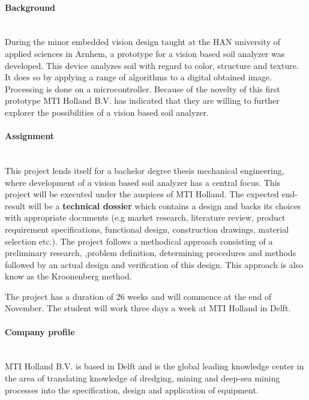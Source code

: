 \documentclass[a4paper,11pt]{texMemo} %
\begin{document}
\maketitle %

\paragraph{Background}\mbox{} \\
During the minor embedded vision design taught at the HAN university of applied sciences in Arnhem, a prototype for a vision based soil analyzer was developed. This device analyzes soil with regard to color, structure and texture. It does so by applying a range of algorithms to a digital obtained image. Processing is done on a microcontroller. Because of the novelty of this first prototype MTI Holland B.V. has indicated that they are willing to further explorer the possibilities of a vision based soil analyzer.

\paragraph{Assignment}\mbox{} \\
This project lends itself for a bachelor degree thesis mechanical engineering, where development of a vision based soil analyzer has a central focus. This project will be executed under the auspices of MTI Holland. The expected end-result will be a \textbf{technical dossier} which contains a design and backs its choices with appropriate documents (e.g market research, literature review, product requirement specifications, functional design, construction drawings, material selection etc.). The project follows a methodical approach consisting of a preliminary research,  ,problem definition, determining procedures and methods followed by an actual design and verification of this design. This approach is also know as the Kroonenberg method.

The project has a duration of 26 weeks and will commence at the end of November. The student will work three days a week at MTI Holland in Delft.

\paragraph{Company profile}\mbox{} \\
MTI Holland B.V. is based in Delft and is the global leading knowledge center in the area of translating knowledge of dredging, mining and deep-sea mining processes into the specification, design and application of equipment. 
\end{document}

